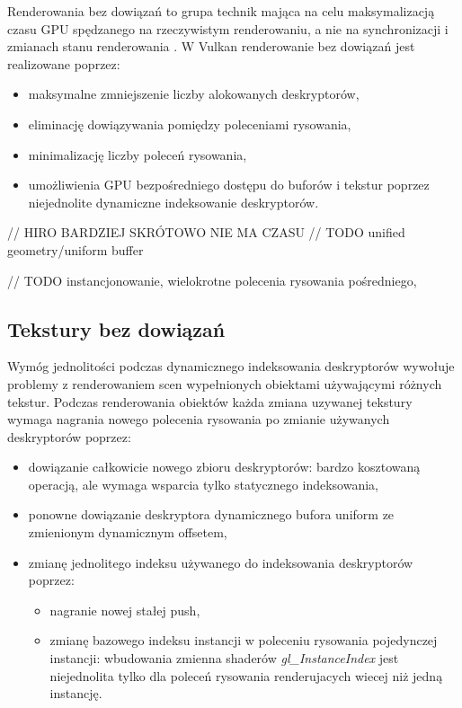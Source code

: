 Renderowania bez dowiązań to grupa technik mająca na celu maksymalizacją czasu GPU spędzanego na rzeczywistym renderowaniu, a nie na synchronizacji i zmianach stanu renderowania \cite{kosarevsky20213d}.
W Vulkan renderowanie bez dowiązań jest realizowane poprzez:
\begin{itemize}
	\item maksymalne zmniejszenie liczby alokowanych deskryptorów,
	\item eliminację dowiązywania pomiędzy poleceniami rysowania,
	\item minimalizację liczby poleceń rysowania,
	\item umożliwienia GPU bezpośredniego dostępu do buforów i tekstur poprzez niejednolite dynamiczne indeksowanie deskryptorów.
\end{itemize}

// HIRO BARDZIEJ SKRÓTOWO NIE MA CZASU
// TODO unified geometry/uniform buffer

// TODO instancjonowanie, wielokrotne polecenia rysowania pośredniego,

\subsection {Tekstury bez dowiązań}

Wymóg jednolitości podczas dynamicznego indeksowania deskryptorów wywołuje problemy z renderowaniem scen wypełnionych obiektami używającymi różnych tekstur.
Podczas renderowania obiektów każda zmiana uzywanej tekstury wymaga nagrania nowego polecenia rysowania po zmianie używanych deskryptorów poprzez:
\begin{itemize}
	\item dowiązanie całkowicie nowego zbioru deskryptorów: bardzo kosztowaną operacją, ale wymaga wsparcia tylko statycznego indeksowania,
	\item ponowne dowiązanie deskryptora dynamicznego bufora uniform ze zmienionym dynamicznym offsetem,
	\item zmianę jednolitego indeksu używanego do indeksowania deskryptorów poprzez:
	\begin{itemize}
		\item nagranie nowej stałej push,
		\item zmianę bazowego indeksu instancji w poleceniu rysowania pojedynczej instancji: wbudowania zmienna shaderów \textit{gl\_InstanceIndex} jest niejednolita tylko dla poleceń rysowania renderujacych wiecej niż jedną instancję.
	\end{itemize}
\end{itemize}

